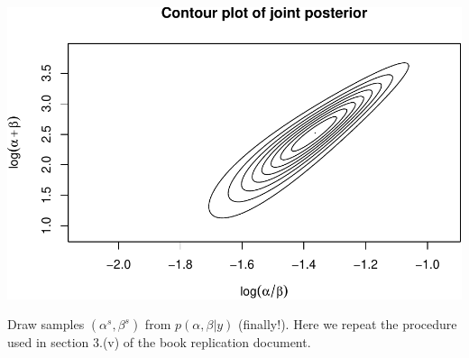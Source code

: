 \documentclass[]{article}
\begin{document}
\includegraphics{Untitled_files/figure-latex/unnamed-chunk-19-1.pdf}

Draw samples \((\alpha^{s}, \beta^{s})\) from \(p(\alpha,\beta|y)\)
(finally!). Here we repeat the procedure used in section 3.(v) of the
book replication document.
\end{document}
